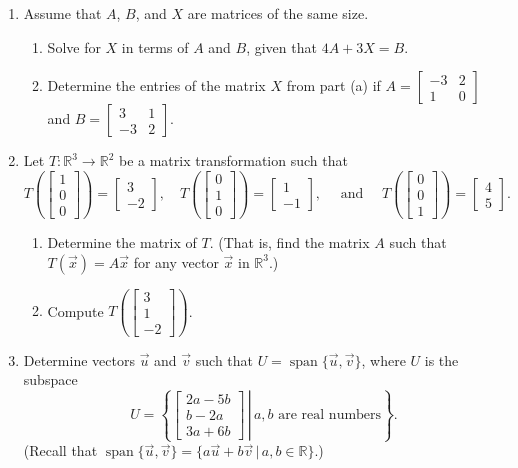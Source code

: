 \documentclass[12pt]{article}
\newcommand{\points}[1]{\marginpar{\hspace{24pt}[#1]}}
\newcommand{\R}{\mathbb{R}}
\newcommand{\bbm}{\begin{bmatrix}}
\newcommand{\ebm}{\end{bmatrix}}
\begin{document}
\begin{enumerate}
\item Assume that $A$, $B$, and $X$ are matrices of the same size.
\begin{enumerate}
 \item Solve for $X$ in terms of $A$ and $B$, given that $4A+3X=B$.\points{3}

\vspace{1in}

 \item Determine the entries of the matrix $X$ from part (a) if $A=\bbm -3&2\\1&0\ebm$ and $B=\bbm 3&1\\-3&2\ebm$.\points{3}
\end{enumerate}

\vspace{2in}

\item Let $T:\R^3\to \R^2$ be a matrix transformation such that
\[
 T\left(\bbm 1\\0\\0\ebm\right) = \bbm 3\\-2\ebm,\quad T\left(\bbm 0\\1\\0\ebm\right) = \bbm 1\\-1\ebm, \quad \text{ and } \quad T\left(\bbm 0\\0\\1\ebm\right) = \bbm 4\\5\ebm.
\]
\begin{enumerate}
 \item Determine the matrix of $T$. (That is, find the matrix $A$ such that $T(\vec{x})=A\vec{x}$ for any vector $\vec{x}$ in $\R^3$.) \points{3}

\vspace{1.25in}

 \item Compute $T\left(\bbm 3\\1\\-2\ebm\right)$. \points{3}
\end{enumerate}

\newpage

\item Determine vectors $\vec{u}$ and $\vec{v}$ such that $U=\operatorname{span}\{\vec{u},\vec{v}\}$, where $U$ is the subspace \points{4}
\[
 U = \left\{\left.\bbm 2a-5b\\b-2a\\3a+6b\ebm \,\right|\, a,b \text{ are real numbers}\right\}.
\]
(Recall that $\operatorname{span}\{\vec{u},\vec{v}\} = \{a\vec{u}+b\vec{v}\,|\, a,b\in\R\}$.)


\end{enumerate}
\end{document}
